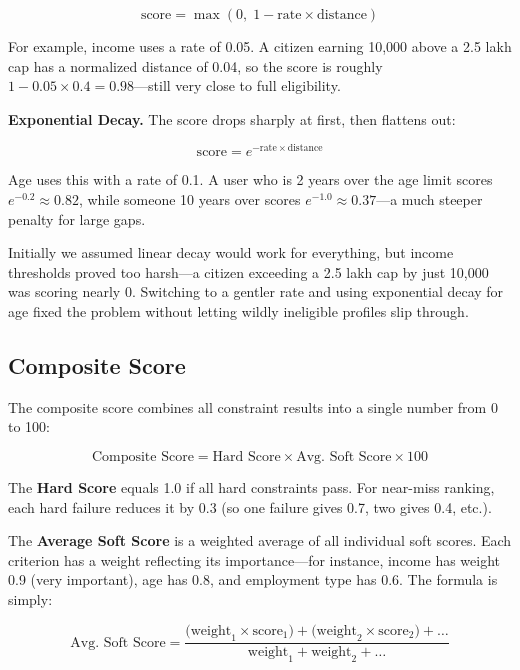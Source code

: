 \documentclass[conference]{IEEEtran}
\newcommand{\rupee}{\textrm{\textup{\text{\textrm{Rs.}}}}}
\begin{document}
\begin{equation}
\text{score} = \max(0,\; 1 - \text{rate} \times \text{distance})
\label{eq:linear}
\end{equation}

For example, income uses a rate of 0.05. A citizen earning \rupee10,000 above a \rupee2.5 lakh cap has a normalized distance of 0.04, so the score is roughly $1 - 0.05 \times 0.4 = 0.98$---still very close to full eligibility.

\textbf{Exponential Decay.} The score drops sharply at first, then flattens out:

\begin{equation}
\text{score} = e^{-\text{rate} \times \text{distance}}
\label{eq:exp}
\end{equation}

Age uses this with a rate of 0.1. A user who is 2 years over the age limit scores $e^{-0.2} \approx 0.82$, while someone 10 years over scores $e^{-1.0} \approx 0.37$---a much steeper penalty for large gaps.

Initially we assumed linear decay would work for everything, but income thresholds proved too harsh---a citizen exceeding a \rupee2.5 lakh cap by just \rupee10,000 was scoring nearly 0. Switching to a gentler rate and using exponential decay for age fixed the problem without letting wildly ineligible profiles slip through.

\subsection{Composite Score}

The composite score combines all constraint results into a single number from 0 to 100:

\begin{equation}
\text{Composite Score} = \text{Hard Score} \times \text{Avg. Soft Score} \times 100
\label{eq:composite}
\end{equation}

The \textbf{Hard Score} equals 1.0 if all hard constraints pass. For near-miss ranking, each hard failure reduces it by 0.3 (so one failure gives 0.7, two gives 0.4, etc.).

The \textbf{Average Soft Score} is a weighted average of all individual soft scores. Each criterion has a weight reflecting its importance---for instance, income has weight 0.9 (very important), age has 0.8, and employment type has 0.6. The formula is simply:

\begin{equation}
\text{Avg. Soft Score} = \frac{\text{(weight}_1 \times \text{score}_1\text{)} + \text{(weight}_2 \times \text{score}_2\text{)} + \ldots}{\text{weight}_1 + \text{weight}_2 + \ldots}
\label{eq:softavg}
\end{equation}
\end{document}
